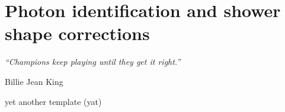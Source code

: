 \chapter{Photon identification and shower shape corrections}
\label{ch:pid}
\epigraph{\emph{“Champions keep playing until they get it right.”}}{Billie Jean King}

yet another template (yat)